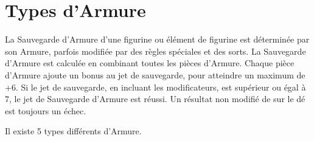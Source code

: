 \newpage
\hypertarget{armourtypes}{\section{Types d'Armure}}
\label{armour_types}

La Sauvegarde d'Armure d'une figurine ou élément de figurine est déterminée par son Armure, parfois modifiée par des règles spéciales et des sorts. La Sauvegarde d'Armure est calculée en combinant toutes les pièces d'Armure. Chaque pièce d'Armure ajoute un bonus au jet de sauvegarde, pour atteindre un maximum de +6. Si le jet de sauvegarde, en incluant les modificateurs, est supérieur ou égal à 7, le jet de Sauvegarde d'Armure est réussi. Un résultat non modifié de  sur le dé est toujours un échec.

Il existe 5 types différents d'Armure.

